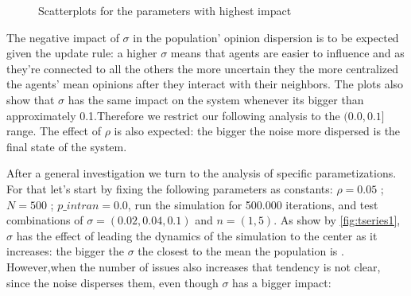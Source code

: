\documentclass{article}
\begin{document}
\begin{figure}[H]
\begin{subfigure}[b]{0.5\textwidth}
     \end{subfigure}
     \caption{Scatterplots for the parameters with highest impact}
      \label{fig:scatters}
    \end{figure}

    The negative impact of \(\sigma\) in the population' opinion dispersion is
    to be expected given the update rule: a higher \(\sigma\) means that agents
    are easier to influence and as they're connected to all the others the more
    uncertain they the more centralized the agents' mean opinions after they
    interact with their neighbors. The plots also show that \(\sigma\) has the
    same impact on the system whenever its bigger than approximately
    0.1.Therefore we restrict our following analysis to the \((0.0, 0.1 ] \)
    range. The effect of \(\rho\) is also expected: the bigger the noise more
    dispersed is the final state of the system.

    After a general investigation we turn to the analysis of specific
    parametizations. For that let's start by fixing the following parameters as
    constants: \(\rho = 0.05 \) ; \(N = 500\) ; \(p\_intran = 0.0\), run the
    simulation for 500.000 iterations, and test combinations of $\sigma = (0.02,
    0.04, 0.1)$ and $ n = (1,5)$. As show by \ref{fig:tseries1}, \(\sigma\) has
    the effect of leading the dynamics of the simulation to the center as it
    increases: the bigger the \(\sigma\) the closest to the mean the population
    is . However,when the number of issues also increases that tendency is not
    clear, since the noise disperses them, even though \(\sigma\) has a bigger
    impact:
\end{document}
